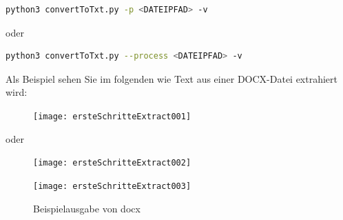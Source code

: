 \documentclass[12pt]{scrartcl}
\begin{document}
\begin{lstlisting}[language=bash]
python3 convertToTxt.py -p <DATEIPFAD> -v 
\end{lstlisting}\begin{center}
oder 
\end{center}
\begin{lstlisting}[language=bash]
python3 convertToTxt.py --process <DATEIPFAD> -v
\end{lstlisting}
Als Beispiel sehen Sie im folgenden wie Text aus einer DOCX-Datei extrahiert wird:
\begin{figure}[htbp]
\centering
\texttt{[image: ersteSchritteExtract001]}\par\vspace{0.25cm}
\label{fig:ersteSchritteExtract001}
\end{figure}
\begin{center}
oder
\end{center}
\begin{figure}[htbp]
\centering
\texttt{[image: ersteSchritteExtract002]}\par\vspace{0.25cm}
\label{fig:ersteSchritteExtract002}
\end{figure}
\begin{figure}[htbp]
\texttt{[image: ersteSchritteExtract003]}\par\vspace{0.25cm}
\caption{Beispielausgabe von docx}
\label{fig:ersteSchritteExtract003}
\end{figure}
\newpage
\end{document}
